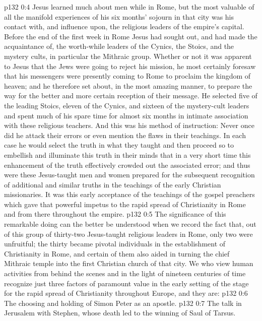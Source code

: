 \vs p132 0:4 Jesus learned much about men while in Rome, but the most valuable of all the manifold experiences of his six months’ sojourn in that city was his contact with, and influence upon, the religious leaders of the empire’s capital. Before the end of the first week in Rome Jesus had sought out, and had made the acquaintance of, the worth\hyp{}while leaders of the Cynics, the Stoics, and the mystery cults, in particular the Mithraic group. Whether or not it was apparent to Jesus that the Jews were going to reject his mission, he most certainly foresaw that his messengers were presently coming to Rome to proclaim the kingdom of heaven; and he therefore set about, in the most amazing manner, to prepare the way for the better and more certain reception of their message. He selected five of the leading Stoics, eleven of the Cynics, and sixteen of the mystery\hyp{}cult leaders and spent much of his spare time for almost six months in intimate association with these religious teachers. And this was his method of instruction: Never once did he attack their errors or even mention the flaws in their teachings. In each case he would select the truth in what they taught and then proceed so to embellish and illuminate this truth in their minds that in a very short time this enhancement of the truth effectively crowded out the associated error; and thus were these Jesus\hyp{}taught men and women prepared for the subsequent recognition of additional and similar truths in the teachings of the early Christian missionaries. It was this early acceptance of the teachings of the gospel preachers which gave that powerful impetus to the rapid spread of Christianity in Rome and from there throughout the empire.
\vs p132 0:5 The significance of this remarkable doing can the better be understood when we record the fact that, out of this group of thirty\hyp{}two Jesus\hyp{}taught religious leaders in Rome, only two were unfruitful; the thirty became pivotal individuals in the establishment of Christianity in Rome, and certain of them also aided in turning the chief Mithraic temple into the first Christian church of that city. We who view human activities from behind the scenes and in the light of nineteen centuries of time recognize just three factors of paramount value in the early setting of the stage for the rapid spread of Christianity throughout Europe, and they are:
\pc \vs p132 0:6 \bibnobreakspace The choosing and holding of Simon Peter as an apostle.
\vs p132 0:7 \bibnobreakspace The talk in Jerusalem with Stephen, whose death led to the winning of Saul of Tarsus.
